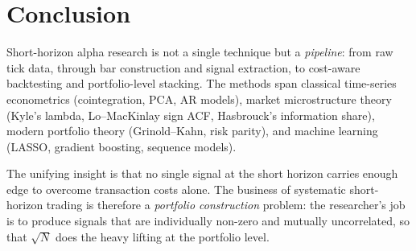 \documentclass[11pt,a4paper]{article}
\begin{document}
\section{Conclusion}

Short-horizon alpha research is not a single technique but a
\emph{pipeline}: from raw tick data, through bar construction and
signal extraction, to cost-aware backtesting and portfolio-level
stacking. The methods span classical time-series econometrics
(cointegration, PCA, AR models), market microstructure theory
(Kyle's lambda, Lo--MacKinlay sign ACF, Hasbrouck's information
share), modern portfolio theory (Grinold--Kahn, risk parity), and
machine learning (LASSO, gradient boosting, sequence models).

The unifying insight is that no single signal at the short horizon
carries enough edge to overcome transaction costs alone. The business
of systematic short-horizon trading is therefore a
\emph{portfolio construction} problem: the researcher's job is to
produce signals that are individually non-zero and mutually
uncorrelated, so that $\sqrt{N}$ does the heavy lifting at the
portfolio level.
\end{document}
